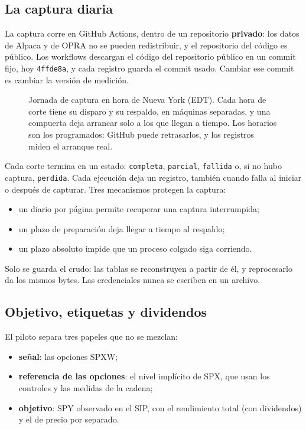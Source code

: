 \subsection{La captura diaria}\label{sec:estado_captura}

La captura corre en GitHub Actions, dentro de un repositorio \textbf{privado}: los datos de Alpaca y de OPRA no
se pueden redistribuir, y el repositorio del código es público. Los workflows descargan el código del
repositorio público en un commit fijo, hoy \texttt{4ffde8a}, y cada registro guarda el commit usado. Cambiar
ese commit es cambiar la versión de medición.

\begin{figure}[H]
\centering
\resizebox{\linewidth}{!}{}
\caption{Jornada de captura en hora de Nueva York (EDT). Cada hora de corte tiene su disparo y su respaldo,
en máquinas separadas, y una compuerta deja arrancar solo a los que llegan a tiempo. Los horarios son los
programados: GitHub puede retrasarlos, y los registros miden el arranque real.}
\label{fig:jornada}
\end{figure}

Cada corte termina en un estado: \texttt{completa}, \texttt{parcial}, \texttt{fallida} o, si no hubo captura,
\texttt{perdida}. Cada ejecución deja un registro, también cuando falla al iniciar o después de capturar.
Tres mecanismos protegen la captura:
\begin{itemize}
\item un diario por página permite recuperar una captura interrumpida;
\item un plazo de preparación deja llegar a tiempo al respaldo;
\item un plazo absoluto impide que un proceso colgado siga corriendo.
\end{itemize}
Solo se guarda el crudo: las tablas se reconstruyen a partir de él, y reprocesarlo da los mismos bytes. Las
credenciales nunca se escriben en un archivo.

\subsection{Objetivo, etiquetas y dividendos}\label{sec:estado_objetivo}

El piloto separa tres papeles que no se mezclan:
\begin{itemize}
\item \textbf{señal}: las opciones SPXW;
\item \textbf{referencia de las opciones}: el nivel implícito de SPX, que usan los controles y las medidas de
la cadena;
\item \textbf{objetivo}: SPY observado en el SIP, con el rendimiento total (con dividendos) y el de precio por
separado.
\end{itemize}

